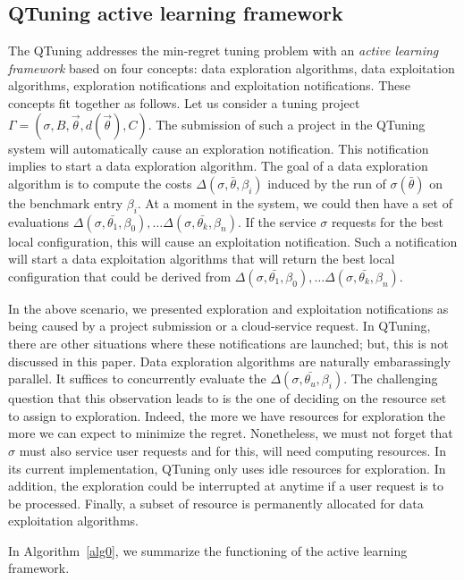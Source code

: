 \documentclass[10pt, conference, compsocconf]{IEEEtran}
\begin{document}
\subsection{QTuning active learning framework}

The QTuning addresses the min-regret tuning problem with an {\it active learning framework}
based on four concepts: data exploration algorithms, data exploitation algorithms,
exploration notifications and exploitation notifications. These concepts fit together as follows. Let us consider
a tuning project  $\Gamma = (\sigma, B, \vec{\theta}, d(\vec{\theta}), C)$. The submission of such a project
in the QTuning system will automatically cause an exploration notification. This notification implies
to start a data exploration algorithm. The goal of a data exploration algorithm is to
compute the costs $\Delta(\sigma, \bar{\theta}, \beta_i)$  induced by the run of  $\sigma(\bar{\theta})$ on the benchmark
entry $\beta_i$.  At a moment in the system, we could then have a set of evaluations
$\Delta(\sigma, \bar{\theta_1}, \beta_0), \dots \Delta(\sigma, \bar{\theta_k}, \beta_n)$. If the service $\sigma$
 requests for the best local configuration, this will cause an exploitation notification. Such a notification will
start a data exploitation algorithms that will return the best local configuration that could be derived from
$\Delta(\sigma, \bar{\theta_1}, \beta_0), \dots \Delta(\sigma, \bar{\theta_k}, \beta_n)$.

In the above scenario, we presented exploration and exploitation notifications as being caused by a project submission or a cloud-service
request. In QTuning, there are other situations where these notifications are launched; but, this is not discussed in this paper.
Data exploration algorithms are naturally embarassingly parallel. It suffices to concurrently evaluate
the $\Delta(\sigma, \bar{\theta_u}, \beta_i)$. The challenging question that this observation leads to is the
one of deciding on the resource set to assign to  exploration. Indeed, the more we have resources for exploration
the more we can expect to minimize the regret. Nonetheless, we must not forget that $\sigma$ must also service
user requests and for this, will need computing resources. In its current implementation, QTuning only uses
idle resources for exploration. In addition, the exploration could be interrupted at anytime if a user
request is to be processed. Finally, a subset of resource is permanently allocated for data exploitation algorithms.

In Algorithm~\ref{alg0}, we summarize the functioning of the active learning framework.
\end{document}
